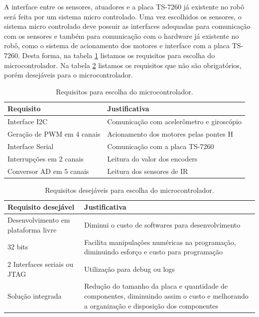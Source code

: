 A interface entre os sensores, atuadores e a placa TS-7260 já existente no robô \cite{bellator_2012} será feita por um sistema micro controlado. Uma vez escolhidos os sensores, o sistema micro controlado deve possuir as interfaces adequadas para comunicação com os sensores e também para comunicação com o hardware já existente no robô, como o sistema de acionamento dos motores e interface com a placa TS-7260. Desta forma, na tabela \ref{tab:requisitos_microcontrolador} listamos os requisitos para escolha do microcontrolador. Na tabela \ref{tab:requisitos_desejaveis_microcontrolador} listamos os requisitos que não são obrigatórios, porém desejáveis para o microcontrolador.

\begin{table}[h]
  \caption{Requisitos para escolha do microcontrolador.}
  \centering
  \begin{tabular}{p{7cm}|p{8cm}}
    \toprule
    \textbf{Requisito} & \textbf{Justificativa} \\
    \hline
    Interface I2C & Comunicação com acelerômetro e giroscópio \\
    \hline
    Geração de PWM em 4 canais & Acionamento dos motores pelas pontes H \\
    \hline
    Interface Serial	 & Comunicação com a placa TS-7260 \\
    \hline
    Interrupções em 2 canais	 & Leitura do valor dos encoders \\
    \hline
    Conversor AD em 5 canais	 & Leitura dos sensores de IR \\
    \bottomrule
  \end{tabular}
  \label{tab:requisitos_microcontrolador}
\end{table}

\begin{table}[h]
  \caption{Requisitos desejáveis para escolha do microcontrolador.}
  \centering
  \begin{tabular}{p{7cm}|p{8cm}}
    \toprule
    \textbf{Requisito desejável} & \textbf{Justificativa} \\
    \hline
    Desenvolvimento em plataforma livre	 & Diminui o custo de softwares para desenvolvimento \\
    \hline
    32 bits & Facilita manipulações numéricas na programação, diminuindo esforço e custo para programação \\
    \hline
    2 Interfaces seriais ou JTAG & Utilização para debug ou logs \\
    \hline
    Solução integrada & Redução do tamanho da placa e quantidade de componentes, diminuindo assim o custo e melhorando a organização e disposição dos componentes \\
    \bottomrule
  \end{tabular}
  \label{tab:requisitos_desejaveis_microcontrolador}
\end{table}

